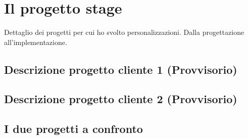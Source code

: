 \chapter{Il progetto stage}
Dettaglio dei progetti per cui ho svolto personalizzazioni. Dalla progettazione all'implementazione.
\section{Descrizione progetto cliente 1 (Provvisorio)}
\section{Descrizione progetto cliente 2 (Provvisorio)}
\section{I due progetti a confronto}
